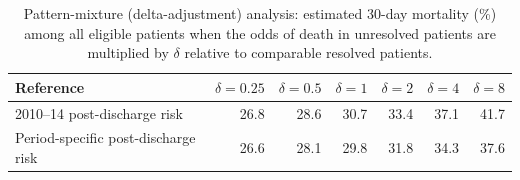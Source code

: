 \begin{table}[htbp]\centering\small
\caption{Pattern-mixture (delta-adjustment) analysis: estimated 30-day mortality (\%) among all eligible patients when the odds of death in unresolved patients are multiplied by $\delta$ relative to comparable resolved patients.}\label{tab:delta}
\begin{tabular}{lrrrrrr}
\toprule
Reference & $\delta=0.25$ & $\delta=0.5$ & $\delta=1$ & $\delta=2$ & $\delta=4$ & $\delta=8$ \\
\midrule
2010--14 post-discharge risk & 26.8 & 28.6 & 30.7 & 33.4 & 37.1 & 41.7 \\
Period-specific post-discharge risk & 26.6 & 28.1 & 29.8 & 31.8 & 34.3 & 37.6 \\
\bottomrule
\end{tabular}
\end{table}
